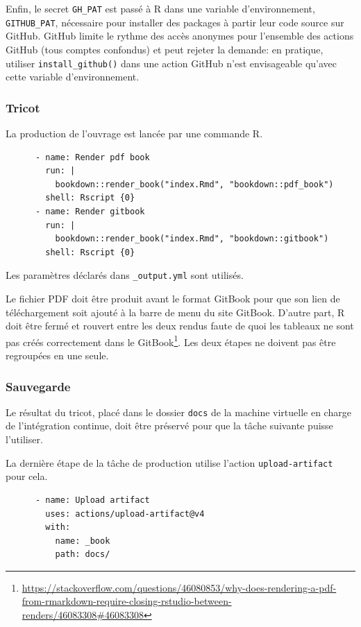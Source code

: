 \documentclass[
  12pt,
  french,
  a4paper,
  extrafontsizes,onecolumn,openright
  ]{memoir}
\newlength{\rf}
\begin{document}
Enfin, le secret \texttt{GH\_PAT} est passé à R dans une variable d'environnement, \texttt{GITHUB\_PAT}, nécessaire pour installer des packages à partir leur code source sur GitHub.
GitHub limite le rythme des accès anonymes pour l'ensemble des actions GitHub (tous comptes confondus) et peut rejeter la demande: en pratique, utiliser \texttt{install\_github()} dans une action GitHub n'est envisageable qu'avec cette variable d'environnement.

\subsubsection{Tricot}\label{tricot}

La production de l'ouvrage est lancée par une commande R.

\begin{verbatim}
      - name: Render pdf book
        run: |
          bookdown::render_book("index.Rmd", "bookdown::pdf_book")
        shell: Rscript {0}
      - name: Render gitbook
        run: |
          bookdown::render_book("index.Rmd", "bookdown::gitbook")
        shell: Rscript {0}
\end{verbatim}

Les paramètres déclarés dans \texttt{\_output.yml} sont utilisés.

Le fichier PDF doit être produit avant le format GitBook pour que son lien de téléchargement soit ajouté à la barre de menu du site GitBook.
D'autre part, R doit être fermé et rouvert entre les deux rendus faute de quoi les tableaux ne sont pas créés correctement dans le GitBook\footnote{\url{https://stackoverflow.com/questions/46080853/why-does-rendering-a-pdf-from-rmarkdown-require-closing-rstudio-between-renders/46083308\#46083308}}.
Les deux étapes ne doivent pas être regroupées en une seule.

\subsubsection{Sauvegarde}\label{sauvegarde}

Le résultat du tricot, placé dans le dossier \texttt{docs} de la machine virtuelle en charge de l'intégration continue, doit être préservé pour que la tâche suivante puisse l'utiliser.

La dernière étape de la tâche de production utilise l'action \texttt{upload-artifact} pour cela.

\begin{verbatim}
      - name: Upload artifact
        uses: actions/upload-artifact@v4
        with:
          name: _book
          path: docs/
\end{verbatim}
\end{document}
